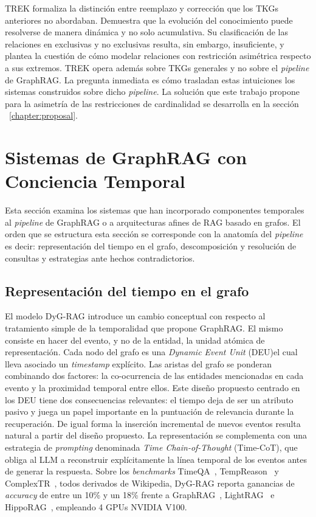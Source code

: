 TREK formaliza la distinción entre reemplazo y corrección que los TKGs anteriores no abordaban. Demuestra que la evolución del conocimiento puede resolverse de manera dinámica y no solo acumulativa. Su clasificación de las relaciones en exclusivas y no exclusivas resulta, sin embargo, insuficiente, y plantea la cuestión de cómo modelar relaciones con restricción asimétrica respecto a sus extremos. TREK opera además sobre TKGs generales y no sobre el \emph{pipeline} de GraphRAG. La pregunta inmediata es cómo trasladan estas intuiciones los sistemas construidos sobre dicho \emph{pipeline}. La solución que este trabajo propone para la asimetría de las restricciones de cardinalidad se desarrolla en la sección ~\ref{chapter:proposal}.

\section{Sistemas de GraphRAG con Conciencia Temporal}\label{sec:temporal-graphrag}

Esta sección examina los sistemas que han incorporado componentes temporales al \emph{pipeline} de GraphRAG o a arquitecturas afines de RAG basado en grafos. El orden que se estructura esta sección se corresponde con la anatomía del \emph{pipeline} es decir: representación del tiempo en el grafo, descomposición y resolución de consultas y estrategias ante hechos contradictorios.

\subsection{Representación del tiempo en el grafo}

El modelo DyG-RAG \cite{dyg_rag2025} introduce un cambio conceptual con respecto al tratamiento simple de la temporalidad que propone GraphRAG. El mismo consiste en hacer del evento, y no de la entidad, la unidad atómica de representación. Cada nodo del grafo es una \emph{Dynamic Event Unit} (DEU)\cite{dyg_rag2025}el cual lleva asociado un \emph{timestamp} explícito. Las aristas del grafo se ponderan combinando dos factores: la co-ocurrencia de las entidades mencionadas en cada evento y la proximidad temporal entre ellos. Este diseño propuesto centrado en los DEU tiene dos consecuencias relevantes: el tiempo deja de ser un atributo pasivo y juega un papel importante en la puntuación de relevancia durante la recuperación. De igual forma la inserción incremental de nuevos eventos resulta natural a partir del diseño propuesto. La representación se complementa con una estrategia de \emph{prompting} denominada \emph{Time Chain-of-Thought} (Time-CoT)\cite{dyg_rag2025}, que obliga al LLM a reconstruir explícitamente la línea temporal de los eventos antes de generar la respuesta. Sobre los \emph{benchmarks} TimeQA~\cite{chen2021timeqa}, TempReason~\cite{tan2023tempreason} y ComplexTR~\cite{tan2023complextr}, todos derivados de Wikipedia, DyG-RAG reporta ganancias de \emph{accuracy} de entre un 10\% y un 18\% frente a GraphRAG~\cite{edge2024local}, LightRAG~\cite{guo2024lightrag} e HippoRAG~\cite{gutierrez2024hipporag}, empleando 4 GPUs NVIDIA V100.

